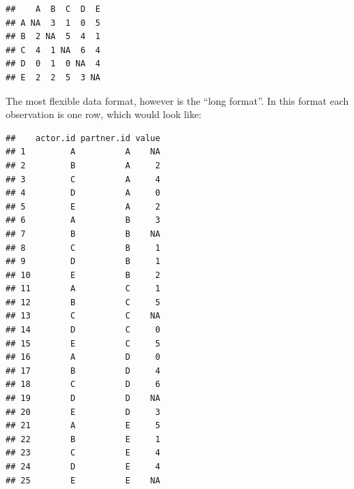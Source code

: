 \documentclass[a4paper]{article}\usepackage[]{graphicx}\usepackage[]{color}
\makeatletter
\newenvironment{kframe}{%
 \def\at@end@of@kframe{}%
 \ifinner\ifhmode%
  \def\at@end@of@kframe{\end{minipage}}%
  \begin{minipage}{\columnwidth}%
 \fi\fi%
 \def\FrameCommand##1{\hskip\@totalleftmargin \hskip-\fboxsep
 \colorbox{shadecolor}{##1}\hskip-\fboxsep
     \hskip-\linewidth \hskip-\@totalleftmargin \hskip\columnwidth}%
 \MakeFramed {\advance\hsize-\width
   \@totalleftmargin\z@ \linewidth\hsize
   \@setminipage}}%
 {\par\unskip\endMakeFramed%
 \at@end@of@kframe}
\newenvironment{knitrout}{}{} %
\makeatother
\begin{document}
\begin{knitrout}\small
{}\color{fgcolor}\begin{kframe}


{\ttfamily\noindent\itshape{}}\begin{verbatim}
##    A  B  C  D  E
## A NA  3  1  0  5
## B  2 NA  5  4  1
## C  4  1 NA  6  4
## D  0  1  0 NA  4
## E  2  2  5  3 NA
\end{verbatim}
\end{kframe}
\end{knitrout}



The most flexible data format, however is the ``long format''. In this format each observation is one row, which would look like:

\begin{knitrout}\small
{}\color{fgcolor}\begin{kframe}
\begin{verbatim}
##    actor.id partner.id value
## 1         A          A    NA
## 2         B          A     2
## 3         C          A     4
## 4         D          A     0
## 5         E          A     2
## 6         A          B     3
## 7         B          B    NA
## 8         C          B     1
## 9         D          B     1
## 10        E          B     2
## 11        A          C     1
## 12        B          C     5
## 13        C          C    NA
## 14        D          C     0
## 15        E          C     5
## 16        A          D     0
## 17        B          D     4
## 18        C          D     6
## 19        D          D    NA
## 20        E          D     3
## 21        A          E     5
## 22        B          E     1
## 23        C          E     4
## 24        D          E     4
## 25        E          E    NA
\end{verbatim}
\end{kframe}
\end{knitrout}
\end{document}
